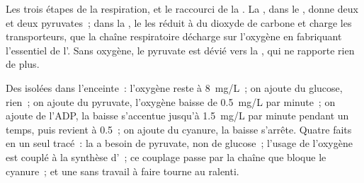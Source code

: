 \begin{omfigure}
{\small Les trois étapes de la respiration, et le raccourci de la
. La , dans le , donne deux  et deux
pyruvates~; dans la , le  les réduit à du
dioxyde de carbone et charge les transporteurs, que la chaîne
respiratoire décharge sur l'oxygène en fabriquant l'essentiel de
l'. Sans oxygène, le pyruvate est dévié vers la , qui
ne rapporte rien de plus.}
\end{omfigure}

\begin{example}\label{ex:g12:respiration-fermentation:trace}
Des  isolées dans l'enceinte~: l'oxygène reste à
\qty{8}{mg/L}~; on ajoute du glucose, rien~; on ajoute du pyruvate,
l'oxygène baisse de \qty{0.5}{mg/L} par minute~; on ajoute de l'ADP,
la baisse s'accentue jusqu'à \qty{1.5}{mg/L} par minute pendant un
temps, puis revient à \num{0.5}~; on ajoute du cyanure, la baisse
s'arrête. Quatre faits en un seul tracé~: la  a besoin de
pyruvate, non de glucose~; l'usage de l'oxygène est couplé à la
synthèse d'~; ce couplage passe par la chaîne que bloque le
cyanure~; et une  sans travail à faire tourne au ralenti.
\end{example}

